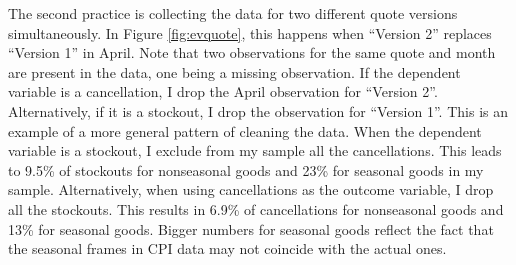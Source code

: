 \documentclass[12pt]{article}
\begin{document}
	The second practice is collecting the data for two different quote versions simultaneously. In Figure \ref{fig:evquote}, this happens when ``Version 2'' replaces ``Version 1'' in April. Note that two observations for the same quote and month are present in the data, one being a missing observation. If the dependent variable is a cancellation, I drop the April observation for ``Version 2''. Alternatively, if it is a stockout, I drop the observation for ``Version 1''. This is an example of a more general pattern of cleaning the data. 
		When the dependent variable is a stockout, I exclude from my sample all the cancellations. This leads to 9.5\% of stockouts for nonseasonal goods and 23\% for seasonal goods in my sample. Alternatively, when using cancellations as the outcome variable, I drop all the stockouts. This results in 6.9\% of cancellations for nonseasonal goods and 13\% for seasonal goods. Bigger numbers for seasonal goods reflect the fact that the seasonal frames in CPI data may not coincide with the actual ones.
	
	
	
\end{document}
